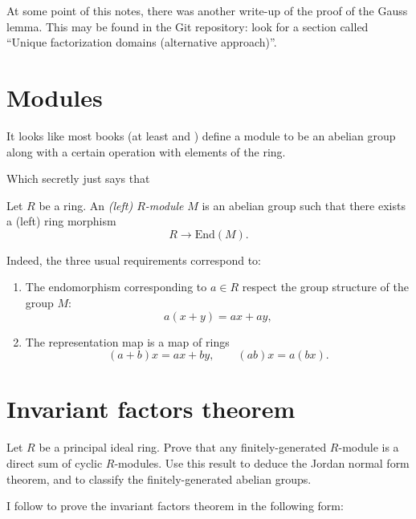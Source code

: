 \begin{remark}
\label{remark-alternative-approach}
At some point of this notes,
there was another write-up of the proof
of the Gauss lemma. This may be found in
the Git repository: look for a section
called ``Unique factorization
domains (alternative approach)''.
\end{remark}

\section{Modules}
\label{section-modules}

It looks like most books (at least
\cite{eis} and \cite{Samuel-Zariski-Vol1})
define a module to be an abelian group
along with a certain operation with
elements of the ring.

Which secretly just says that

\begin{definition}
\label{definition-module}
Let $R$ be a ring.
An {\it (left) $R$-module} $M$ is an abelian
group
such that there exists a (left) ring morphism
$$
R \to \text{End}(M).
$$
\end{definition}

\noindent
Indeed, the three usual requirements
correspond to:

\begin{enumerate}
\item The endomorphism corresponding to $a
\in R$
respect the group structure of the group $M$:
$$
a(x+y)=ax+ay,
$$

\item The representation map is a map of
rings
$$
(a+b)x=ax+by,\qquad (ab)x=a(bx).
$$
\end{enumerate}

\section{Invariant factors theorem}
\label{section-invariant-factors-theorem}
 
\begin{exercise}
\label{exercise-invariant-factors-theorem}
Let $R$ be a principal ideal ring. Prove that
any finitely-generated $R$-module is a direct
sum of cyclic $R$-modules. Use this result to
deduce the Jordan normal form theorem, and to
classify the finitely-generated abelian
groups.
\end{exercise}

I follow \cite[Section 12.1]{dummit} 
to prove the
invariant factors theorem in
the following form:

